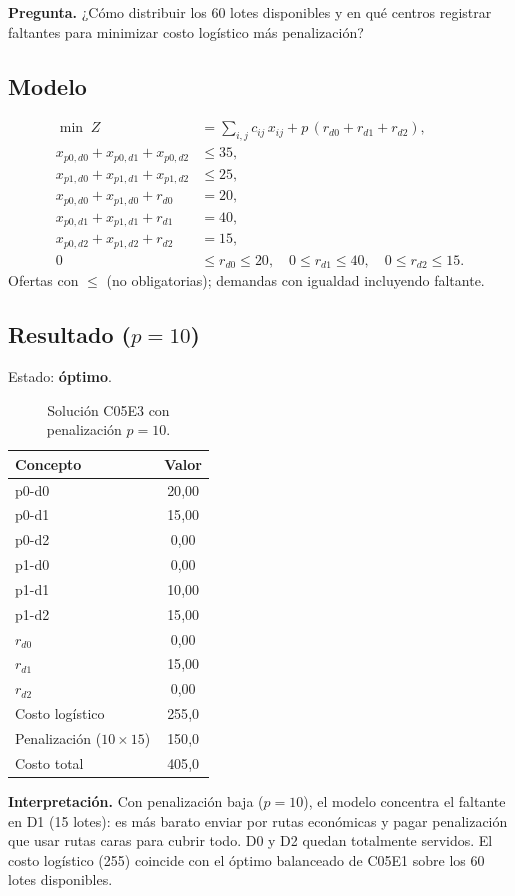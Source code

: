 \documentclass[11pt,a4paper]{article}
\newcommand{\pregunta}[1]{\noindent\textbf{Pregunta.} #1\par}
\newcommand{\interpretacion}[1]{\noindent\textbf{Interpretación.} #1\par}
\begin{document}
\pregunta{¿Cómo distribuir los 60 lotes disponibles y en qué centros registrar faltantes para minimizar costo logístico más penalización?}

\subsection*{Modelo}
\begin{align}
\min \; Z &= \sum_{i,j} c_{ij}\, x_{ij} + p\,(r_{d0}+r_{d1}+r_{d2}),\\
x_{p0,d0}+x_{p0,d1}+x_{p0,d2} &\le 35,\\
x_{p1,d0}+x_{p1,d1}+x_{p1,d2} &\le 25,\\
x_{p0,d0}+x_{p1,d0}+r_{d0} &= 20,\\
x_{p0,d1}+x_{p1,d1}+r_{d1} &= 40,\\
x_{p0,d2}+x_{p1,d2}+r_{d2} &= 15,\\
0 &\le r_{d0}\le 20,\quad 0\le r_{d1}\le 40,\quad 0\le r_{d2}\le 15.
\end{align}
Ofertas con $\le$ (no obligatorias); demandas con igualdad incluyendo faltante.

\subsection*{Resultado ($p=10$)}
Estado: \textbf{óptimo}.
\begin{table}[H]
\centering
\small
\caption{Solución C05E3 con penalización $p=10$.}
\begin{tabular}{@{}lc@{}}
\toprule
Concepto & Valor \\
\midrule
p0-d0 & 20{,}00 \\
p0-d1 & 15{,}00 \\
p0-d2 & 0{,}00 \\
p1-d0 & 0{,}00 \\
p1-d1 & 10{,}00 \\
p1-d2 & 15{,}00 \\
\midrule
$r_{d0}$ & 0{,}00 \\
$r_{d1}$ & 15{,}00 \\
$r_{d2}$ & 0{,}00 \\
\midrule
Costo logístico & 255{,}0 \\
Penalización ($10\times 15$) & 150{,}0 \\
Costo total & 405{,}0 \\
\bottomrule
\end{tabular}
\end{table}

\interpretacion{Con penalización baja ($p=10$), el modelo concentra el faltante en D1 (15 lotes): es más barato enviar por rutas económicas y pagar penalización que usar rutas caras para cubrir todo. D0 y D2 quedan totalmente servidos. El costo logístico (255) coincide con el óptimo balanceado de C05E1 sobre los 60 lotes disponibles.}
\end{document}
